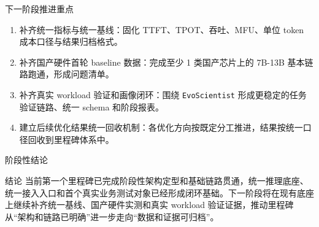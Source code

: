 \documentclass[aspectratio=169,11pt]{ctexbeamer}
\begin{document}
\begin{frame}{下一阶段推进重点}
  \begin{enumerate}
    \item 补齐统一指标与统一基线：固化 TTFT、TPOT、吞吐、MFU、单位 token 成本口径与结果归档格式。
    \item 补齐国产硬件首轮 baseline 数据：完成至少 1 类国产芯片上的 7B-13B 基本链路跑通，形成问题清单。
    \item 补齐真实 workload 验证和画像闭环：围绕 \texttt{EvoScientist} 形成更稳定的任务验证链路、统一 schema 和阶段报表。
    \item 建立后续优化结果统一回收机制：各优化方向按既定分工推进，结果按统一口径回收到里程碑体系中。
  \end{enumerate}
\end{frame}

\begin{frame}{阶段性结论}
  \begin{block}{结论}
    当前第一个里程碑已完成阶段性架构定型和基础链路贯通，统一推理底座、统一接入入口和首个真实业务测试对象已经形成闭环基础。下一阶段将在现有底座上继续补齐统一基线、国产硬件实测和真实 workload 验证证据，推动里程碑从“架构和链路已明确”进一步走向“数据和证据可归档”。
  \end{block}
\end{frame}
\end{document}
